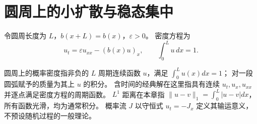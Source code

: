 \section{圆周上的小扩散与稳态集中}
令圆周长度为 $L$，$b(x+L)=b(x)$，$\varepsilon>0$。
密度方程为
\[
 u_t=\varepsilon u_{xx}-(b(x)u)_x,\qquad
 \int_0^L u\,dx=1.
\]

\begin{definition}[周期密度与经典解]
圆周上的概率密度指非负的 $L$ 周期连续函数 $u$，满足 $\displaystyle\int_0^Lu(x)dx=1$；
对一段圆弧赋予的质量为其上 $u$ 的积分。
含时间的经典解在这里指具有连续 $u_t,u_x,u_{xx}$ 并逐点满足密度方程的周期函数。
$L^1$ 距离在本章指 $\|u-v\|_1=\displaystyle\int_0^L|u-v|dx$，所有函数光滑，均为通常积分。
概率流 $J$ 以守恒式 $u_t=-J_x$ 定义其输运意义，不预设随机过程的一般理论。
\end{definition}


